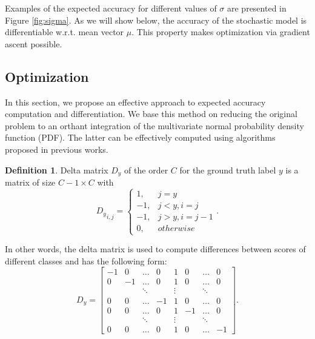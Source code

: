 \documentclass[nohyperref]{article}
\theoremstyle{plain}
\theoremstyle{definition}
\newtheorem{definition}[theorem]{Definition}
\theoremstyle{remark}
\begin{document}
Examples of the expected accuracy for different values of $\sigma$ are presented in Figure \ref{fig:sigma}. As we will show below, the accuracy of the stochastic model is differentiable w.r.t. mean vector $\mu$. This property makes optimization via gradient ascent possible.

\subsection{Optimization}
In this section, we propose an effective approach to expected accuracy computation and differentiation. We base this method on reducing the original problem to an orthant integration of the multivariate normal probability density function (PDF). The latter can be effectively computed using algorithms proposed in previous works.



\vskip 0.05in
\begin{definition}
Delta matrix $D_y$ of the order $C$ for the ground truth label $y$ is a matrix of size $C - 1 \times C$ with
\begin{equation}
    {D_y}_{i, j} = \begin{cases}
      1, & j = y \\
      -1, & j < y, i = j \\
      -1, & j > y, i = j - 1 \\
      0, & otherwise
    \end{cases}.
\end{equation}
\end{definition}
In other words, the delta matrix is used to compute differences between scores of different classes and has the following form:
\begin{equation}
D_y = \begin{bmatrix}
  -1 & 0 & \dots & 0 & 1 & 0 & \dots & 0 \\
  0 & -1 & \dots & 0 & 1 & 0 & \dots & 0 \\
  & & \ddots & & \vdots & & \ddots & \\
  0 & 0 & \dots & -1 & 1 & 0 & \dots & 0 \\
  0 & 0 & \dots & 0 & 1 & -1 & \dots & 0 \\
  & & \ddots & & \vdots & & \ddots & \\
  0 & 0 & \dots & 0 & 1 & 0 & \dots & -1
\end{bmatrix}.
\end{equation}
\end{document}
